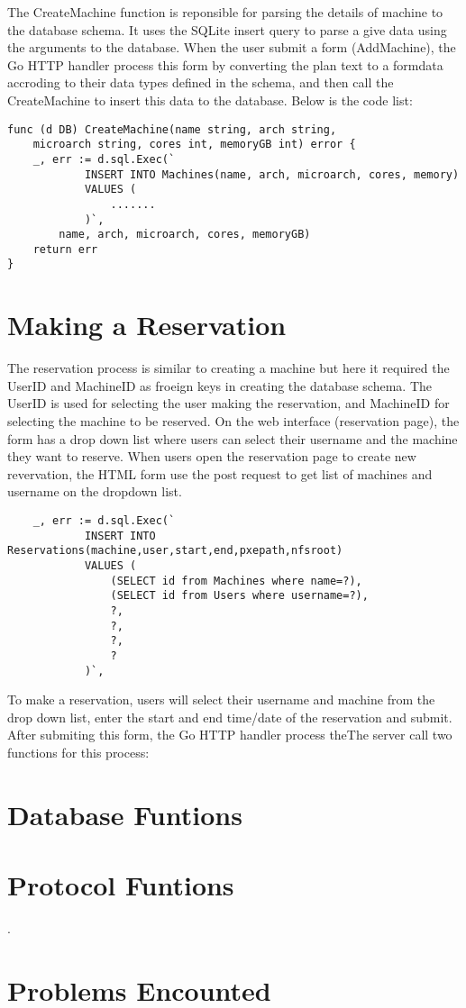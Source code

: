 The CreateMachine function is reponsible for parsing the details of machine to the database schema. It uses the SQLite insert query to parse a give data using the arguments to the database. When the user submit a form (AddMachine), the Go HTTP handler process this form by converting the plan text to a formdata accroding to their data types defined in the schema, and then call the CreateMachine to insert this data to the database. Below is the code list:
\begin{lstlisting}
func (d DB) CreateMachine(name string, arch string,
	microarch string, cores int, memoryGB int) error {
	_, err := d.sql.Exec(`
			INSERT INTO Machines(name, arch, microarch, cores, memory)
			VALUES (
				.......
			)`,
		name, arch, microarch, cores, memoryGB)
	return err
}

\end{lstlisting}


\section*{Making a Reservation}
The reservation process is similar to creating a machine but here it required the UserID and MachineID as froeign keys in creating the database schema. The UserID is used for selecting  the user making the reservation, and MachineID for selecting the machine to be reserved. On the web interface (reservation page), the form has a drop down list where users can select their username and the machine they want to reserve. When users open the reservation page to create new revervation, the HTML form use the post request to get list of machines and username on the dropdown list.
\begin{lstlisting}
	_, err := d.sql.Exec(`
			INSERT INTO Reservations(machine,user,start,end,pxepath,nfsroot)
			VALUES (
				(SELECT id from Machines where name=?),
				(SELECT id from Users where username=?),
				?,
				?,
				?,
				?
			)`,
\end{lstlisting}

To make a reservation, users will select their username and machine from the drop down list, enter the start and end time/date of the reservation and submit. After submiting this form, the Go HTTP handler process theThe server call two functions for this process: 

\section*{Database Funtions}
\section*{Protocol Funtions}
.

\section{Problems Encounted}




